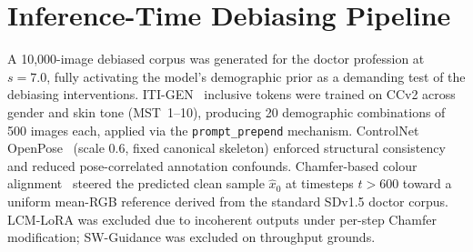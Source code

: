 \section{Inference-Time Debiasing Pipeline}

A 10,000-image debiased corpus was generated for the doctor profession at $s{=}7.0$,
fully activating the model's demographic prior as a demanding test of the debiasing
interventions. ITI-GEN~\cite{Zhang_2023_ITIGEN} inclusive tokens were trained on CCv2
across gender and skin tone (MST~1--10), producing 20 demographic combinations of 500
images each, applied via the \texttt{prompt\_prepend} mechanism. ControlNet
OpenPose~\cite{LZhang_2023_ControlNet} (scale 0.6, fixed canonical skeleton) enforced
structural consistency and reduced pose-correlated annotation confounds.
Chamfer-based colour alignment~\cite{Shum_2025_ColorAlignment} steered the predicted
clean sample $\hat{x}_0$ at timesteps $t{>}600$ toward a uniform mean-RGB reference
derived from the standard SDv1.5 doctor corpus. LCM-LoRA was excluded due to incoherent
outputs under per-step Chamfer modification; SW-Guidance was excluded on throughput
grounds.




